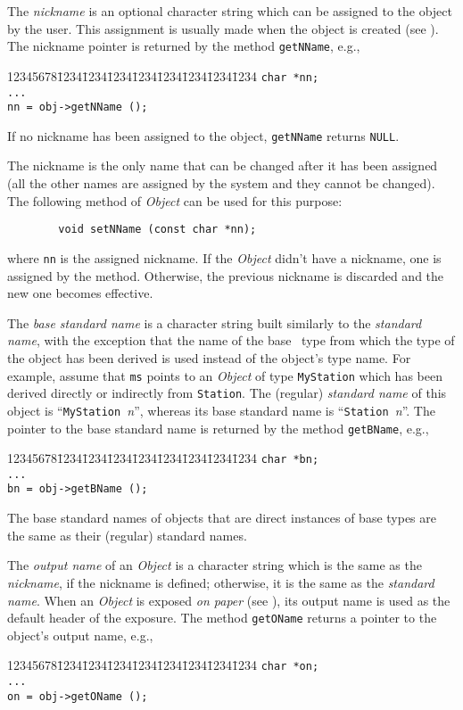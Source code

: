 The {\em nickname\/} is an optional character string which can be assigned to
the object by the user.
This assignment is usually made when the object is created
(see ).
The nickname pointer is returned by the method {\tt getNName}, e.g.,
{\tt\begin{tabbing}
12345678\=1234\=1234\=1234\=1234\=1234\=1234\=1234\=1234\kill
 \> {\tt char *nn;}\\
 \> {\tt ...}\\
 \> {\tt nn = obj->getNName ();}
\end{tabbing}}
\noindent
If no nickname has been assigned to the object, {\tt getNName} returns
{\tt NULL}.

The nickname is the only name that can be changed after it has been
assigned (all the other names are assigned by the system and they cannot
be changed).
The following method of {\em Object\/} can be used for this purpose:
\begin{verbatim}
        void setNName (const char *nn);
\end{verbatim}
where {\tt nn} is the assigned nickname.
If the {\em Object\/} didn't have a nickname, one is assigned by the method.
Otherwise, the previous nickname is discarded and the new one becomes
effective.

The {\em base standard name\/} is a character string
built similarly to the {\em standard name},
with the exception that the name of the base \smurph\ type from which the
type of the object has been derived is used instead of the object's
type name.
For example, assume that {\tt ms} points to an {\em Object\/} of
type {\tt MyStation} which has
been derived directly or indirectly from {\tt Station}.
The (regular) {\em standard name\/} of this object is
``{\tt MyStation~}{\em n}'',
whereas its base standard name is ``{\tt Station~}{\em n}''.
The pointer to the base standard name is returned by the method
{\tt getBName}, e.g.,
{\tt\begin{tabbing}
12345678\=1234\=1234\=1234\=1234\=1234\=1234\=1234\=1234\kill
 \> {\tt char *bn;}\\
 \> {\tt ...}\\
 \> {\tt bn = obj->getBName ();}
\end{tabbing}}
\noindent
The base standard names of objects that are direct instances of base types
are the same as their (regular) standard names.

The {\em output name\/} of an {\em Object\/} is a character string which is
the same as the {\em nickname}, if the nickname is defined; otherwise,
it is the same as the {\em standard name}.
When an {\em Object\/} is exposed {\em on paper\/} (see ),
its output name is used as the default header of the exposure.
The method {\tt getOName} returns a pointer to the object's output name,
e.g.,
{\tt\begin{tabbing}
12345678\=1234\=1234\=1234\=1234\=1234\=1234\=1234\=1234\kill
 \> {\tt char *on;}\\
 \> {\tt ...}\\
 \> {\tt on = obj->getOName ();}
\end{tabbing}}

